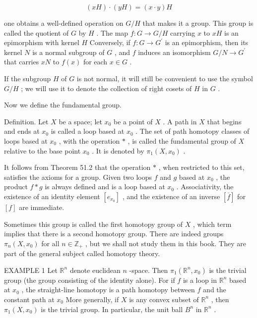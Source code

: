 \documentclass[10pt]{article}
\begin{document}
\[
\left( {xH}\right)  \cdot  \left( {yH}\right)  = \left( {x \cdot  y}\right) H
\]

one obtains a well-defined operation on \(G/H\) that makes it a group. This group is called the quotient of \(G\) by \(H\) . The map \(f : G \rightarrow  G/H\) carrying \(x\) to \({xH}\) is an epimorphism with kernel \(H\) Conversely, if \(f : G \rightarrow  {G}^{\prime }\) is an epimorphism, then its kernel \(N\) is a normal subgroup of \(G\) , and \(f\) induces an isomorphism \(G/N \rightarrow  {G}^{\prime }\) that carries \({xN}\) to \(f\left( x\right)\) for each \(x \in  G\) .

If the subgroup \(H\) of \(G\) is not normal, it will still be convenient to use the symbol \(G/H\) ; we will use it to denote the collection of right cosets of \(H\) in \(G\) .

Now we define the fundamental group.

Definition. Let \(X\) be a space; let \({x}_{0}\) be a point of \(X\) . A path in \(X\) that begins and ends at \({x}_{0}\) is called a loop based at \({x}_{0}\) . The set of path homotopy classes of loops based at \({x}_{0}\) , with the operation \(*\) , is called the fundamental group of \(X\) relative to the base point \({x}_{0}\) . It is denoted by \({\pi }_{1}\left( {X,{x}_{0}}\right)\) .

It follows from Theorem 51.2 that the operation \(*\) , when restricted to this set, satisfies the axioms for a group. Given two loops \(f\) and \(g\) based at \({x}_{0}\) , the product \(f * g\) is always defined and is a loop based at \({x}_{0}\) . Associativity, the existence of an identity element \(\left\lbrack  {e}_{{x}_{0}}\right\rbrack\) , and the existence of an inverse \(\left\lbrack  \bar{f}\right\rbrack\) for \(\left\lbrack  f\right\rbrack\) are immediate.

Sometimes this group is called the first homotopy group of \(X\) , which term implies that there is a second homotopy group. There are indeed groups \({\pi }_{n}\left( {X,{x}_{0}}\right)\) for all \(n \in  {\mathbb{Z}}_{ + }\) , but we shall not study them in this book. They are part of the general subject called homotopy theory.

EXAMPLE 1 Let \({\mathbb{R}}^{n}\) denote euclidean \(n\) -space. Then \({\pi }_{1}\left( {{\mathbb{R}}^{n},{x}_{0}}\right)\) is the trivial group (the group consisting of the identity alone). For if \(f\) is a loop in \({\mathbb{R}}^{n}\) based at \({x}_{0}\) , the straight-line homotopy is a path homotopy between \(f\) and the constant path at \({x}_{0}\) More generally, if \(X\) is any convex subset of \({\mathbb{R}}^{n}\) , then \({\pi }_{1}\left( {X,{x}_{0}}\right)\) is the trivial group. In particular, the unit ball \({B}^{n}\) in \({\mathbb{R}}^{n}\) .
\end{document}
